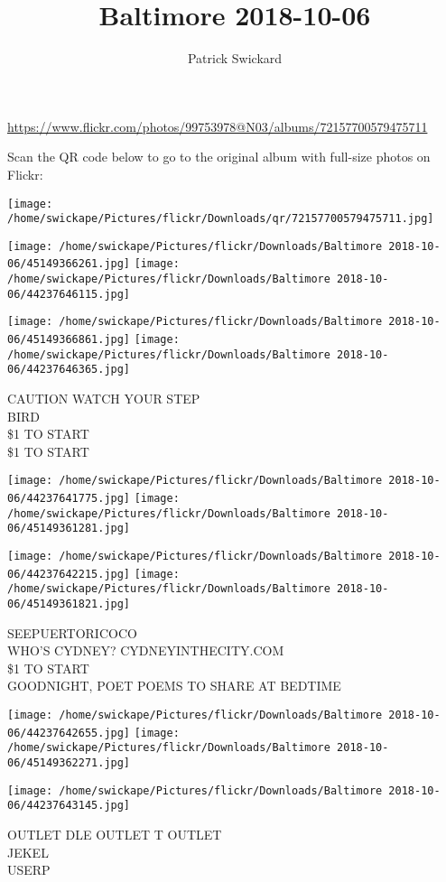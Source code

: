 \documentclass[10pt,letterpaper]{article}
\title{Baltimore 2018-10-06}
\author{Patrick Swickard}
\date{}
\begin{document}
\maketitle

\url{https://www.flickr.com/photos/99753978@N03/albums/72157700579475711}

Scan the QR code below to go to the original album with full-size photos on Flickr:

\texttt{[image: /home/swickape/Pictures/flickr/Downloads/qr/72157700579475711.jpg]}
\pagebreak

\texttt{[image: /home/swickape/Pictures/flickr/Downloads/Baltimore 2018-10-06/45149366261.jpg]}
\texttt{[image: /home/swickape/Pictures/flickr/Downloads/Baltimore 2018-10-06/44237646115.jpg]}

\texttt{[image: /home/swickape/Pictures/flickr/Downloads/Baltimore 2018-10-06/45149366861.jpg]}
\texttt{[image: /home/swickape/Pictures/flickr/Downloads/Baltimore 2018-10-06/44237646365.jpg]}

CAUTION WATCH YOUR STEP\\
BIRD\\
\$1 TO START\\
\$1 TO START
\pagebreak

\texttt{[image: /home/swickape/Pictures/flickr/Downloads/Baltimore 2018-10-06/44237641775.jpg]}
\texttt{[image: /home/swickape/Pictures/flickr/Downloads/Baltimore 2018-10-06/45149361281.jpg]}

\texttt{[image: /home/swickape/Pictures/flickr/Downloads/Baltimore 2018-10-06/44237642215.jpg]}
\texttt{[image: /home/swickape/Pictures/flickr/Downloads/Baltimore 2018-10-06/45149361821.jpg]}

SEEPUERTORICOCO\\
WHO'S CYDNEY?  CYDNEYINTHECITY.COM\\
\$1 TO START\\
GOODNIGHT, POET POEMS TO SHARE AT BEDTIME
\pagebreak

\texttt{[image: /home/swickape/Pictures/flickr/Downloads/Baltimore 2018-10-06/44237642655.jpg]}
\texttt{[image: /home/swickape/Pictures/flickr/Downloads/Baltimore 2018-10-06/45149362271.jpg]}

\texttt{[image: /home/swickape/Pictures/flickr/Downloads/Baltimore 2018-10-06/44237643145.jpg]}

OUTLET DLE OUTLET T OUTLET\\
JEKEL\\
USERP
\pagebreak
\end{document}
